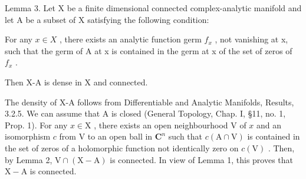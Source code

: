 Lemma 3. Let X be a finite dimensional connected complex-analytic manifold and let A be a subset of X satisfying the following condition:

For any \(x \in X\) , there exists an analytic function germ \(f_{x}\) , not vanishing at x, such that the germ of A at x is contained in the germ at x of the set of zeros of \(f_{x}\) .

Then X-A is dense in X and connected.

The density of X-A follows from Differentiable and Analytic Manifolds, Results, 3.2.5. We can assume that A is closed (General Topology, Chap. I, §11, no. 1, Prop. 1). For any \(x \in \mathrm{X}\) , there exists an open neighbourhood \(\mathrm{V}\) of \(x\) and an isomorphism \(c\) from \(\mathrm{V}\) to an open ball in \(\mathbf{C}^n\) such that \(c(\mathrm{A} \cap \mathrm{V})\) is contained in the set of zeros of a holomorphic function not identically zero on \(c(\mathrm{V})\) . Then, by Lemma 2, \(\mathrm{V} \cap (\mathrm{X} - \mathrm{A})\) is connected. In view of Lemma 1, this proves that \(\mathrm{X} - \mathrm{A}\) is connected.

